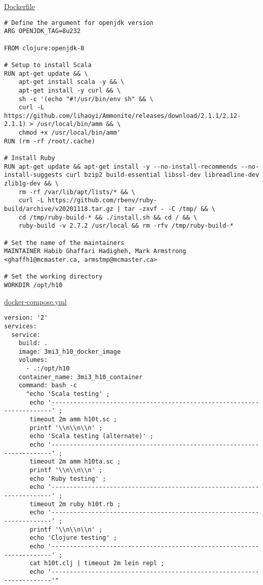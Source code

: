 \documentclass[11pt]{article}
\begin{document}
\href{./testing/h10/Dockerfile}{Dockerfile}
\begin{verbatim}
# Define the argument for openjdk version
ARG OPENJDK_TAG=8u232

FROM clojure:openjdk-8

# Setup to install Scala
RUN apt-get update && \
    apt-get install scala -y && \
    apt-get install -y curl && \
    sh -c '(echo "#!/usr/bin/env sh" && \
    curl -L https://github.com/lihaoyi/Ammonite/releases/download/2.1.1/2.12-2.1.1) > /usr/local/bin/amm && \
    chmod +x /usr/local/bin/amm'
RUN (rm -rf /root/.cache)

# Install Ruby
RUN apt-get update && apt-get install -y --no-install-recommends --no-install-suggests curl bzip2 build-essential libssl-dev libreadline-dev zlib1g-dev && \
    rm -rf /var/lib/apt/lists/* && \
    curl -L https://github.com/rbenv/ruby-build/archive/v20201118.tar.gz | tar -zxvf - -C /tmp/ && \
    cd /tmp/ruby-build-* && ./install.sh && cd / && \
    ruby-build -v 2.7.2 /usr/local && rm -rfv /tmp/ruby-build-*

# Set the name of the maintainers
MAINTAINER Habib Ghaffari Hadigheh, Mark Armstrong <ghaffh1@mcmaster.ca, armstmp@mcmaster.ca>

# Set the working directory
WORKDIR /opt/h10
\end{verbatim}

\href{./testing/h10/docker-compose.yml}{docker-compose.yml}
\begin{verbatim}
version: '2'
services:
  service:
    build: .
    image: 3mi3_h10_docker_image
    volumes:
      - .:/opt/h10
    container_name: 3mi3_h10_container
    command: bash -c
      "echo 'Scala testing' ;
       echo '----------------------------------------------------------------------' ;
       timeout 2m amm h10t.sc ;
       printf '\\n\\n\\n' ;
       echo 'Scala testing (alternate)' ;
       echo '----------------------------------------------------------------------' ;
       timeout 2m amm h10ta.sc ;
       printf '\\n\\n\\n' ;
       echo 'Ruby testing' ;
       echo '----------------------------------------------------------------------' ;
       timeout 2m ruby h10t.rb ;
       echo '----------------------------------------------------------------------' ;
       printf '\\n\\n\\n' ;
       echo 'Clojure testing' ;
       echo '----------------------------------------------------------------------' ;
       cat h10t.clj | timeout 2m lein repl ;
       echo '----------------------------------------------------------------------'"
\end{verbatim}
\end{document}
